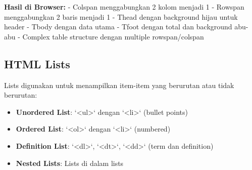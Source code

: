 \textbf{Hasil di Browser:}
- Colspan menggabungkan 2 kolom menjadi 1
- Rowspan menggabungkan 2 baris menjadi 1
- Thead dengan background hijau untuk header
- Tbody dengan data utama
- Tfoot dengan total dan background abu-abu
- Complex table structure dengan multiple rowspan/colspan

\subsection{HTML Lists}

Lists digunakan untuk menampilkan item-item yang berurutan atau tidak berurutan:

\begin{itemize}
  \item \textbf{Unordered List}: `<ul>` dengan `<li>` (bullet points)
  \item \textbf{Ordered List}: `<ol>` dengan `<li>` (numbered)
  \item \textbf{Definition List}: `<dl>`, `<dt>`, `<dd>` (term dan definition)
  \item \textbf{Nested Lists}: Lists di dalam lists
\end{itemize}

